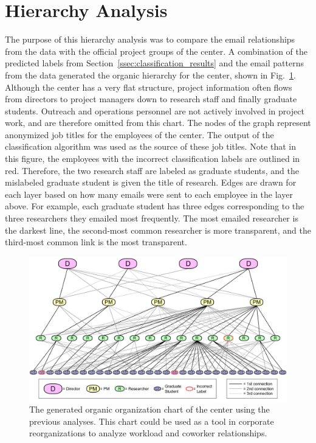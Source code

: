 \documentclass[12pt]{report}
\begin{document}
\section{Hierarchy Analysis}
The purpose of this hierarchy analysis was to compare the email relationships from the data with the official project groups of the center.
A combination of the predicted labels from Section~\ref{ssec:classification_results} and the email patterns from the data generated the organic hierarchy for the center, shown in Fig.~\ref{fig:generated_hierarchy}.
Although the center has a very flat structure, project information often flows from directors to project managers down to research staff and finally graduate students.
Outreach and operations personnel are not actively involved in project work, and are therefore omitted from this chart.
The nodes of the graph represent anonymized job titles for the employees of the center.
The output of the classification algorithm was used as the source of these job titles.
Note that in this figure, the employees with the incorrect classification labels are outlined in red.
Therefore, the two research staff are labeled as graduate students, and the mislabeled graduate student is given the title of research.
Edges are drawn for each layer based on how many emails were sent to each employee in the layer above.
For example, each graduate student has three edges corresponding to the three researchers they emailed most frequently.
The most emailed researcher is the darkest line, the second-most common researcher is more transparent, and the third-most common link is the most transparent.

\begin{figure}[t]
	\centering
	\includegraphics[width=1.05\columnwidth,trim={0mm 0mm 0mm 0mm},clip]{org_chart_with_legend}
	\vspace{-7pt}
	\caption[Generated organic organization chart of the center]{The generated organic organization chart of the center using the previous analyses.  This chart could be used as a tool in corporate reorganizations to analyze workload and coworker relationships.}
	\label{fig:generated_hierarchy}
\end{figure}
\end{document}
